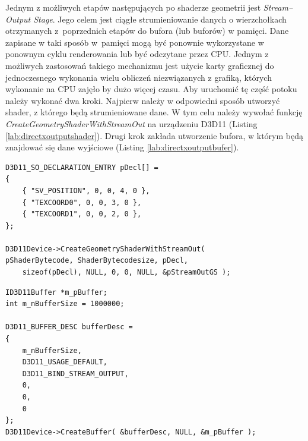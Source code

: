 \documentclass[archive]{mgr}
\begin{document}
Jednym z możliwych etapów następujących po shaderze geometrii jest \emph{Stream–Output Stage}. Jego celem jest ciągłe strumieniowanie danych o wierzchołkach otrzymanych z~poprzednich etapów do bufora (lub buforów) w pamięci. Dane zapisane w taki sposób w~pamięci mogą być ponownie wykorzystane w ponownym cyklu renderowania lub być odczytane przez CPU. Jednym z możliwych zastosowań takiego mechanizmu jest użycie karty graficznej do jednoczesnego wykonania wielu obliczeń niezwiązanych z grafiką, których wykonanie na CPU zajęło by dużo więcej czasu. Aby uruchomić tę część potoku należy wykonać dwa kroki. Najpierw należy w odpowiedni sposób utworzyć shader, z którego będą strumieniowane dane. W tym celu należy wywołać funkcję \emph{CreateGeometryShaderWithStreamOut} na urządzeniu D3D11 (Listing \ref{lab:directxoutputshader}). Drugi krok zakłada utworzenie bufora, w którym będą znajdować się dane wyjściowe (Listing \ref{lab:directxoutputbufer}).\\


\begin{lstlisting}[caption={DirectX, Stream–Output, Utworzenie shadera},captionpos=b,label={lab:directxoutputshader}]
D3D11_SO_DECLARATION_ENTRY pDecl[] =
{
    { "SV_POSITION", 0, 0, 4, 0 }, 
    { "TEXCOORD0", 0, 0, 3, 0 },  
    { "TEXCOORD1", 0, 0, 2, 0 },  
};

D3D11Device->CreateGeometryShaderWithStreamOut( 
pShaderBytecode, ShaderBytecodesize, pDecl, 
    sizeof(pDecl), NULL, 0, 0, NULL, &pStreamOutGS );
\end{lstlisting}


\begin{lstlisting}[caption={DirectX, Stream–Output, Tworzenie bufora},captionpos=b,label={lab:directxoutputbufer}]
ID3D11Buffer *m_pBuffer;
int m_nBufferSize = 1000000;

D3D11_BUFFER_DESC bufferDesc =
{
    m_nBufferSize,
    D3D11_USAGE_DEFAULT,
    D3D11_BIND_STREAM_OUTPUT,
    0,
    0,
    0
};
D3D11Device->CreateBuffer( &bufferDesc, NULL, &m_pBuffer );
\end{lstlisting}
\end{document}
